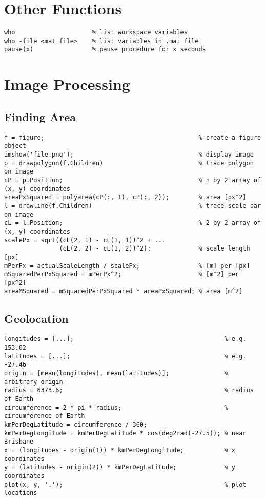 \documentclass{article}
\begin{document}
\section*{Other Functions}
\begin{verbatim}
who                     % list workspace variables
who -file <mat file>    % list variables in .mat file
pause(x)                % pause procedure for x seconds
\end{verbatim}
\section*{Image Processing}
\subsection*{Finding Area}
\begin{verbatim}
f = figure;                                          % create a figure object
imshow('file.png');                                  % display image
p = drawpolygon(f.Children)                          % trace polygon on image
cP = p.Position;                                     % n by 2 array of (x, y) coordinates
areaPxSquared = polyarea(cP(:, 1), cP(:, 2));        % area [px^2]
l = drawline(f.Children)                             % trace scale bar on image
cL = l.Position;                                     % 2 by 2 array of (x, y) coordinates
scalePx = sqrt((cL(2, 1) - cL(1, 1))^2 + ...
               (cL(2, 2) - cL(1, 2))^2);             % scale length [px]
mPerPx = actualScaleLength / scalePx;                % [m] per [px]
mSquaredPerPxSquared = mPerPx^2;                     % [m^2] per [px^2]
areaMSquared = mSquaredPerPxSquared * areaPxSquared; % area [m^2]
\end{verbatim}
\subsection*{Geolocation}
\begin{verbatim}
longitudes = [...];                                         % e.g. 153.02
latitudes = [...];                                          % e.g. -27.46
origin = [mean(longitudes), mean(latitudes)];               % arbitrary origin
radius = 6373.6;                                            % radius of Earth
circumference = 2 * pi * radius;                            % circumference of Earth
kmPerDegLatitude = circumference / 360;
kmPerDegLongitude = kmPerDegLatitude * cos(deg2rad(-27.5)); % near Brisbane
x = (longitudes - origin(1)) * kmPerDegLongitude;           % x coordinates
y = (latitudes - origin(2)) * kmPerDegLatitude;             % y coordinates
plot(x, y, '.');                                            % plot locations
\end{verbatim}
\end{document}
